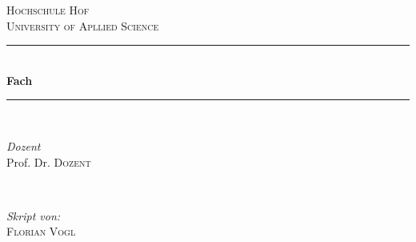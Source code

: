 
\begin{titlepage} %
	\newcommand{\HRule}{\rule{\linewidth}{0.5mm}} %

	\center %


	\textsc{\LARGE Hochschule Hof}\\[1.5cm] %

	\textsc{\Large University of Apllied Science}\\[0.5cm] %



	\HRule\\[0.4cm]

	{\huge\bfseries Fach}\\[0.4cm] %

	\HRule\\[1.5cm]


	\begin{minipage}{0.4\textwidth}
		\begin{flushleft}
			\large
			\textit{Dozent}\\
			Prof. Dr. \textsc{Dozent}
		\end{flushleft}
	\end{minipage}
	~
	\begin{minipage}{0.4\textwidth}
		\begin{flushright}
			\large
			\textit{Skript von:}\\
			\textsc{Florian Vogl}
		\end{flushright}
	\end{minipage}


\end{titlepage}
